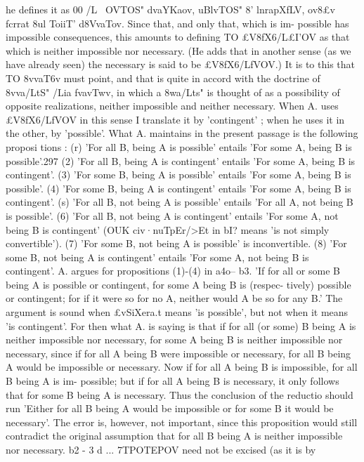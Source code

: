he defines it as 00 /L~ OVTOS" dvaYKa{ov, uBlvTOS" 8' lnrapXfLV, ov8£v
fcrrat 8ul ToiiT' d8VvaTov. Since that, and only that, which is im-
possible has impossible consequences, this amounts to defining TO
£V8fX6/L£I'OV as that which is neither impossible nor necessary. (He
adds that in another sense (as we have already seen) the necessary
is said to be £V8fX6/LfVOV.) It is to this that TO 8vvaT6v must point,
and that is quite in accord with the doctrine of 8vva/LtS" /Lia
fvavT{wv, in which a 8wa/Lts" is thought of as a possibility of opposite
realizations, neither impossible and neither necessary. When A.
uses £V8fX6/LfVOV in this sense I translate it by 'contingent' ; when
he uses it in the other, by 'possible'.
What A. maintains in the present passage is the following
proposi tions :
(r) 'For all B, being A is possible' entails 'For some A, being
B is possible'.297
(2) 'For all B, being A is contingent' entails 'For some A,
being B is contingent'.
(3) 'For some B, being A is possible' entails 'For some A,
being B is possible'.
(4) 'For some B, being A is contingent' entails 'For some A,
being B is contingent'.
(s) 'For all B, not being A is possible' entails 'For all A, not
being B is possible'.
(6) 'For all B, not being A is contingent' entails 'For some A,
not being B is contingent' (OUK civ·nuTpEr/>Et in bI? means
'is not simply convertible').
(7) 'For some B, not being A is possible' is inconvertible.
(8) 'For some B, not being A is contingent' entails 'For some
A, not being B is contingent'.
A. argues for propositions (1)-(4) in a4o-- b3. 'If for all or some B
being A is possible or contingent, for some A being B is (respec-
tively) possible or contingent; for if it were so for no A, neither
would A be so for any B.' The argument is sound when £vSiXera.t
means 'is possible', but not when it means 'is contingent'. For
then what A. is saying is that if for all (or some) B being A is
neither impossible nor necessary, for some A being B is neither
impossible nor necessary, since if for all A being B were impossible
or necessary, for all B being A would be impossible or necessary.
Now if for all A being B is impossible, for all B being A is im-
possible; but if for all A being B is necessary, it only follows that
for some B being A is necessary. Thus the conclusion of the
reductio should run 'Either for all B being A would be impossible
or for some B it would be necessary'. The error is, however, not
important, since this proposition would still contradict the original
assumption that for all B being A is neither impossible nor
necessary. b2 - 3 d ... 7TPOTEPOV need not be excised (as it is by
}}
